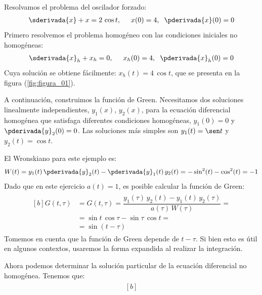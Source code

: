 \begin{ejemplo}
Resolvamos el problema del oscilador forzado:
\begin{align*}
\sderivada{x} + x = 2 \, \cos t, \hspace{0.5cm} x (0) = 4, \hspace{0.2cm} \pderivada{x} (0) = 0
\end{align*}
Primero resolvemos el problema homogéneo con las condiciones iniciales no homogéneas:
\begin{align*}
\sderivada{x}_{h} + x_{h} = 0, \hspace{0.5cm} x_{h} (0) = 4, \hspace{0.2cm} \pderivada{x}_{h} (0) = 0
\end{align*}
Cuya solución se obtiene fácilmente: $x_{h} (t) = 4 \, \cos t$, que se presenta en la figura (\ref{fig:figura_01}).
\par
A continuación, construimos la función de Green. Necesitamos dos soluciones linealmente independientes, $y_{1} (x)$, $y_{2} (x)$, para la ecuación diferencial homogénea que satisfaga diferentes condiciones homogéneas, $y_{1} (0) = 0$ y $\pderivada{y}_{2} (0) = 0$. Las soluciones más simples son $y_{1} (t) = \sen t$ y $y_{2} (t) = \cos t$.
\par
El Wronskiano para este ejemplo es:
\begin{align*}
W (t) = y_{1} (t) \, \pderivada{y}_{2} (t) - \pderivada{y}_{1} (t) \, y_{2} (t) = - \sin^{2} (t) - \cos^{2} (t) = - 1 
\end{align*}
Dado que en este ejercicio $a (t) = 1$, es posible calcular la función de Green:
\begin{align}
\begin{aligned}[b]
G (t, \tau) &= G (t, \tau) = \dfrac{y_{1} (\tau) \, y_{2} (t) - y_{1} (t) \, y_{2} (\tau)}{a (\tau) \, W (\tau)} = \\[0.5em]
&= \sin t \, \cos \tau - \sin \tau \, \cos t = \\[0.5em]
&= \sin (t - \tau)
\end{aligned}
\label{eq:ecuacion_07_23}
\end{align}
Tomemos en cuenta que la función de Green depende de $t - \tau$. Si bien esto es útil en algunos contextos, usaremos la forma expandida al realizar la integración.
\par
Ahora podemos determinar la solución particular de la ecuación diferencial no homogénea. Tenemos que:
\begin{align}
\begin{aligned}[b]

\end{aligned}
\end{align}
\end{ejemplo}
